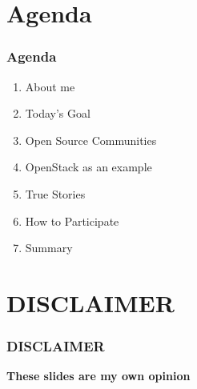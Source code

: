 \documentclass[aspectratio=169,11pt,hyperref={colorlinks=true}]{beamer}
\begin{document}
\section{Agenda}
\begin{frame}
  \frametitle{Agenda}
  \begin{enumerate}
    \item About me
    \item Today's Goal
    \item Open Source Communities
    \item OpenStack as an example
    \item True Stories
    \item How to Participate
    \item Summary
  \end{enumerate}
\end{frame}

\section{DISCLAIMER}
\begin{frame}
  \frametitle{DISCLAIMER}
  \Huge{\bf{These slides are my own opinion}}
\end{frame}
\end{document}
